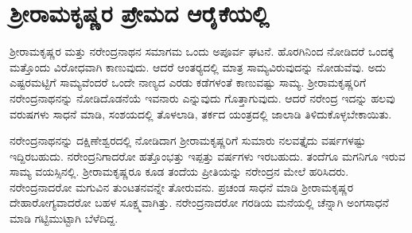 
\chapter{ಶ‍್ರೀರಾಮಕೃಷ್ಣರ ಪ್ರೇಮದ ಆರೈಕೆಯಲ್ಲಿ}

ಶ‍್ರೀರಾಮಕೃಷ್ಣರ ಮತ್ತು ನರೇಂದ್ರನಾಥನ ಸಮಾಗಮ ಒಂದು ಅಪೂರ್ವ ಘಟನೆ. ಹೊರಗಿನಿಂದ ನೋಡಿದರೆ ಒಂದಕ್ಕೆ ಮತ್ತೊಂದು ವಿರೋಧವಾಗಿ ಕಾಣುವುದು. ಆದರೆ ಆಂತರ‍್ಯದಲ್ಲಿ ಮಾತ್ರ ಸಾಮ್ಯವಿರುವುದನ್ನು ನೋಡುವೆವು. ಅದು ಎಷ್ಟರಮಟ್ಟಿಗೆ ಸಾಮ್ಯವೆಂದರೆ ಒಂದೇ ನಾಣ್ಯದ ಎರಡು ಕಡೆಗಳಂತೆ ಕಾಣುವಷ್ಟು ಸಾಮ್ಯ. ಶ‍್ರೀರಾಮಕೃಷ್ಣರಿಗೆ ನರೇಂದ್ರನಾಥನನ್ನು ನೋಡಿದೊಡನೆಯೆ ಇವನಾರು ಎನ್ನುವುದು ಗೊತ್ತಾಗುವುದು. ಆದರೆ ನರೇಂದ್ರ ಇದನ್ನು ಹಲವು ವರುಷಗಳು ಸಾಧನೆ ಮಾಡಿ, ಸಂಶಯದಲ್ಲಿ ತೊಳಲಾಡಿ, ತರ್ಕದ ಯಂತ್ರದಲ್ಲಿ ಜಾಲಾಡಿ ತಿಳಿದುಕೊಳ್ಳಬೇಕಾಯಿತು.

ನರೇಂದ್ರನಾಥನನ್ನು ದಕ್ಷಿಣೇಶ್ವರದಲ್ಲಿ ನೋಡಿದಾಗ ಶ‍್ರೀರಾಮಕೃಷ್ಣರಿಗೆ ಸುಮಾರು ನಲವತ್ತೈದು ವರ್ಷಗಳಷ್ಟು ಇದ್ದಿರಬಹುದು. ನರೇಂದ್ರನಿಗಾದರೋ ಹತ್ತೊಂಭತ್ತು ಇಪ್ಪತ್ತು ವರ್ಷಗಳು ಇರಬಹುದು. ತಂದೆಗೂ ಮಗನಿಗೂ ಇರುವ ಸಾಮ್ಯ ವಯಸ್ಸಿನಲ್ಲಿ. ಶ‍್ರೀರಾಮಕೃಷ್ಣರೂ ಕೂಡ ತಂದೆಯ ಪ್ರೀತಿಯನ್ನು ನರೇಂದ್ರನ ಮೇಲೆ ಹರಿಸಿದರು. ನರೇಂದ್ರನಾದರೋ ಮಗುವಿನ ತುಂಟತನವನ್ನೇ ತೋರುವನು. ಪ್ರಚಂಡ ಸಾಧನೆ ಮಾಡಿ ಶ‍್ರೀರಾಮಕೃಷ್ಣರ ದೇಹಾರೋಗ್ಯವಾದರೋ ಬಹಳ ಸೂಕ್ಷ್ಮವಾಗಿತ್ತು. ನರೇಂದ್ರನಾದರೋ ಗರಡಿಯ ಮನೆಯಲ್ಲಿ ಚೆನ್ನಾಗಿ ಅಂಗಸಾಧನೆ ಮಾಡಿ ಗಟ್ಟಿಮುಟ್ಟಾಗಿ ಬೆಳೆದಿದ್ದ.


